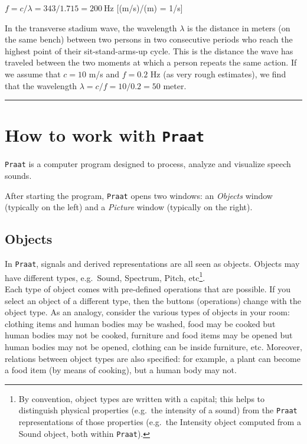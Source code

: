\documentclass[
]{book}
\begin{document}
\(f = c / \lambda = 343 / 1.715 = 200\ \textrm{Hz}\) {[}(m/s)/(m) = 1/s{]}

In the transverse stadium wave, the wavelength \(\lambda\) is the distance in meters (on the same bench) between two persons in two consecutive periods who reach the highest point of their sit-stand-arms-up cycle. This is the distance the wave has traveled between the two moments at which a person repeats the same action. If we assume that \(c=10\) m/s and \(f=0.2\) Hz (as very rough estimates), we find that the wavelength \(\lambda=c/f=10/0.2=50\) meter.

\begin{center}\rule{0.5\linewidth}{0.5pt}\end{center}

\label{box-praatintro}
\section{\texorpdfstring{How to work with \texttt{Praat}}{How to work with Praat}}\label{sec:praatintro}

\texttt{Praat} is a computer program designed to process, analyze and visualize speech sounds.

After starting the program, \texttt{Praat} opens two windows: an \emph{Objects} window (typically on the left) and a \emph{Picture} window (typically on the right).

\subsection*{Objects}\label{objects}

In \texttt{Praat}, signals and derived representations are all seen as objects. Objects may have different types, e.g.~Sound, Spectrum, Pitch, etc\footnote{By convention, object types are written with a capital; this helps to distinguish physical properties (e.g.~the intensity of a sound) from the \texttt{Praat} representations of those properties (e.g.~the Intensity object computed from a Sound object, both within \texttt{Praat}).}.\\
Each type of object comes with pre-defined operations that are possible. If you select an object of a different type, then the buttons (operations) change with the object type.
As an analogy, consider the various types of objects in your room: clothing items and human bodies may be washed, food may be cooked but human bodies may not be cooked, furniture and food items may be opened but human bodies may not be opened, clothing can be inside furniture, etc. Moreover, relations between object types are also specified: for example, a plant can become a food item (by means of cooking), but a human body may not.
\end{document}
